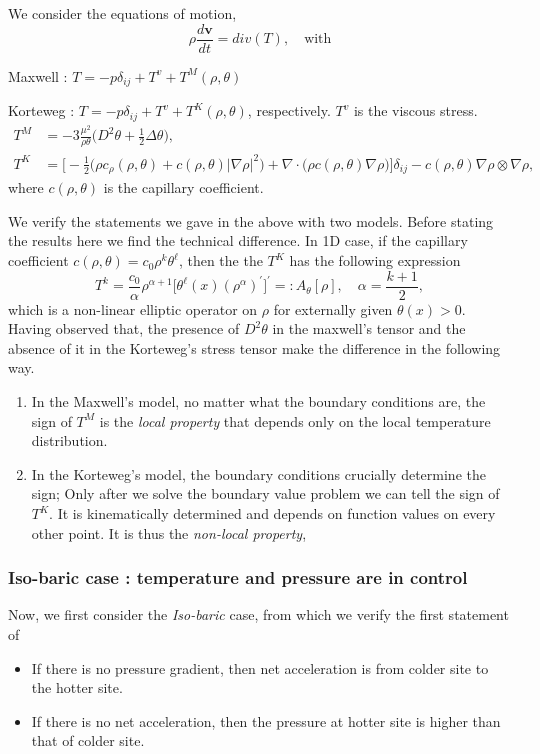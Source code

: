 \documentclass[a4paper,12pt]{article}
\begin{document}
We consider the equations of motion,
$$ \rho \frac{d\mathbf{v}}{dt} = div(T), \quad \text{with}$$

Maxwell : {{{ $T = -p \delta_{ij} + T^v + T^M(\rho,\theta)$ }}}

Korteweg : {{{ $T= -p \delta_{ij} + T^v + T^K(\rho,\theta)$, }}}
respectively. $T^v$ is the viscous stress.
\begin{align*}
T^M &= -3\frac{\mu^2}{\rho\theta} \big( D^2 \theta + \frac{1}{2}\Delta \theta\big),\\
T^K &= \Big[-\frac{1}{2} \big(\rho c_\rho (\rho,\theta) + c(\rho,\theta) |\nabla \rho|^2\big) + \nabla \cdot \big(\rho c(\rho,\theta) \nabla \rho\big) \Big] \delta_{ij} - c(\rho,\theta) \nabla \rho \otimes \nabla\rho,
\end{align*}
where $c(\rho,\theta)$ is the capillary coefficient.

We verify the statements we gave in the above with two models. Before stating the results here we find the technical difference. In 1D case, if the capillary coefficient {{{ $c(\rho,\theta) = c_0 \rho^k \theta^\ell$}}}, then the
the {{{$T^K$}}} has the following expression  $$ T^k = \frac{c_0}{\alpha} \rho^{\alpha+1} \Big[ \theta^{\ell}(x) (\rho^{\alpha})^\prime \Big]^\prime=:A_\theta[\rho], \quad \alpha = \frac{k+1}{2}, $$ which is a non-linear elliptic operator on $\rho$ for externally given $\theta(x)>0$.
Having observed that, the presence of $D^2\theta$ in the maxwell's tensor and the absence of it in the Korteweg's stress tensor make the difference in the following way.
\begin{enumerate}
 \item In the Maxwell's model, no matter what the boundary conditions are, the sign of $T^M$ is the {\it local property} that depends only on the local temperature distribution.
 \item In the Korteweg's model, the boundary conditions crucially determine the sign; Only after we solve the boundary value problem we can tell the sign of $T^K$. It is kinematically determined and depends on function values on every other point. It is thus the {\it non-local property}, 
\end{enumerate}

\subsubsection{Iso-baric case : temperature and pressure are in control}
Now, we first consider the {\it Iso-baric} case, from which we verify the first statement of
 \begin{itemize}
  \item If there is no pressure gradient, then net acceleration is from colder site to the hotter site.
  \item If there is no net acceleration, then the pressure at hotter site is higher than that of colder site.
 \end{itemize}
\end{document}
